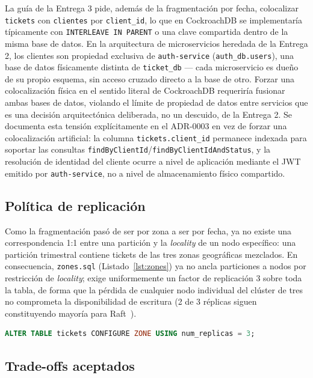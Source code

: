 \documentclass[11pt,letterpaper]{article}
\begin{document}
La guía de la Entrega 3 pide, además de la fragmentación por fecha, colocalizar \texttt{tickets}
con \texttt{clientes} por \texttt{client\_id}, lo que en CockroachDB se implementaría típicamente
con \texttt{INTERLEAVE IN PARENT} o una clave compartida dentro de la misma base de datos. En la
arquitectura de microservicios heredada de la Entrega 2, los clientes son propiedad exclusiva de
\texttt{auth-service} (\texttt{auth\_db.users}), una base de datos físicamente distinta de
\texttt{ticket\_db} — cada microservicio es dueño de su propio esquema, sin acceso cruzado directo
a la base de otro. Forzar una colocalización física en el sentido literal de CockroachDB
requeriría fusionar ambas bases de datos, violando el límite de propiedad de datos entre servicios
que es una decisión arquitectónica deliberada, no un descuido, de la Entrega 2. Se documenta esta
tensión explícitamente en el ADR-0003 en vez de forzar una colocalización artificial: la columna
\texttt{tickets.client\_id} permanece indexada para soportar las consultas
\texttt{findByClientId}/\texttt{findByClientIdAndStatus}, y la resolución de identidad del cliente
ocurre a nivel de aplicación mediante el JWT emitido por \texttt{auth-service}, no a nivel de
almacenamiento físico compartido.

\subsection{Política de replicación}

Como la fragmentación pasó de ser por zona a ser por fecha, ya no existe una correspondencia 1:1
entre una partición y la \emph{locality} de un nodo específico: una partición trimestral contiene
tickets de las tres zonas geográficas mezclados. En consecuencia, \texttt{zones.sql}
(Listado~\ref{lst:zones}) ya no ancla particiones a nodos por restricción de \emph{locality};
exige uniformemente un factor de replicación 3 sobre toda la tabla, de forma que la pérdida de
cualquier nodo individual del clúster de tres no comprometa la disponibilidad de escritura
(2 de 3 réplicas siguen constituyendo mayoría para Raft~\cite{ongaro2014raft}).

\begin{lstlisting}[language=SQL, caption={Política de replicación uniforme (\texttt{zones.sql})}, label={lst:zones}]
ALTER TABLE tickets CONFIGURE ZONE USING num_replicas = 3;
\end{lstlisting}

\subsection{Trade-offs aceptados}
\end{document}
